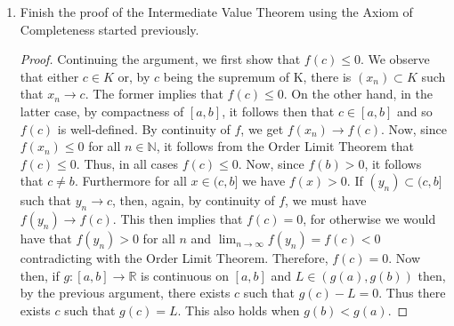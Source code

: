 \begin{enumerate}
\begin{proof}
\begin{enumerate}
    \item \underline{Continuity on \( (a,b) \)}: Let \( c \in (a,b) \). Notice \( f \) is then increasing and has the IVP on \( [a,c] \). So following from (b), we will get that there exists \( \delta_{1} > 0 \) such that for all \( x \) such that \( x < c \) and \( c-x < \delta_{1} \) we will have \( \vert f(x) - f(c) \vert < \epsilon \). Similarly \( f \) is increasing and has the IVP on \( [c,b] \). So following form (a), we will get that there exists \( \delta_{2} > 0 \) such that for all \( x \) such that \( c < x \) and \( x-c < \delta_{2} \) we will have \( \vert f(x) - f(c) \vert < \epsilon \). Thus if \( \delta = \min\{\delta_{1},\delta_{2}\} \) then \( \vert x - c \vert < \delta \) implies that \( \vert f(x) - f(c) \vert < \epsilon \). Thus \( f \) is continuous at \( c \).
    \end{enumerate}
    Therefore, altogether, we have that \( f \) is continuous on \( [a,b] \).
    \end{proof}
    
    \item Finish the proof of the Intermediate Value Theorem using the Axiom of Completeness started previously.
    \begin{proof}
    Continuing the argument, we first show that \( f(c) \leq 0 \). We observe that either \( c \in K \) or, by \( c \) being the supremum of K, there is \( (x_{n}) \subset K \) such that \( x_{n} \rightarrow c \). The former implies that \( f(c) \leq 0 \). On the other hand, in the latter case, by compactness of \( [a,b] \), it follows then that \( c \in [a,b] \) and so \( f(c) \) is well-defined. By continuity of \( f \), we get \( f(x_{n}) \rightarrow f(c) \). Now, since \( f(x_{n}) \leq 0 \) for all \( n \in \mathbb{N} \), it follows from the Order Limit Theorem that \( f(c) \leq 0 \). Thus, in all cases \( f(c) \leq 0 \). Now, since \( f(b) > 0 \), it follows that \( c \neq b \). Furthermore for all \( x \in (c,b] \) we have \( f(x) > 0 \). If \( (y_{n}) \subset (c,b] \) such that \( y_{n} \rightarrow c \), then, again, by continuity of \( f \), we must have \( f(y_{n}) \rightarrow f(c) \). This then implies that \( f(c) = 0 \), for otherwise we would have that \( f(y_{n}) > 0 \) for all \( n \) and \( \lim_{n \rightarrow \infty} f(y_{n}) = f(c) < 0 \) contradicting with the Order Limit Theorem. Therefore, \( f(c) = 0 \). Now then, if \( g: [a,b] \rightarrow \mathbb{R} \) is continuous on \( [a,b] \) and \( L \in (g(a),g(b)) \) then, by the previous argument, there exists \( c \) such that \( g(c) - L = 0 \). Thus there exists \( c \) such that \( g(c) = L \). This also holds when \( g(b) < g(a) \).
    \end{proof}
    

\end{enumerate}
